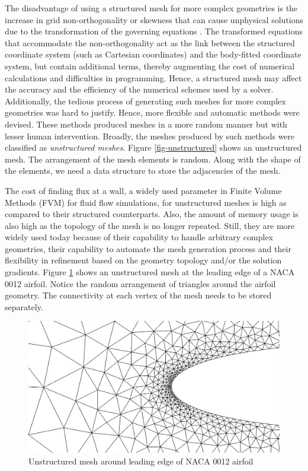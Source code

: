 The disadvantage of using a structured mesh for more complex geometries is the increase in grid non-orthogonality or skewness that can cause unphysical solutions due to the transformation of the governing equations \cite{TU2013219}. The transformed equations that accommodate the non-orthogonality act as the link between the structured coordinate system (such as Cartesian coordinates) and the body-fitted coordinate system, but contain additional terms, thereby augmenting the cost of numerical calculations and difficulties in programming. Hence, a structured mesh may affect the accuracy and the efficiency of the numerical schemes used by a solver. Additionally, the tedious process of generating such meshes for more complex geometries was hard to justify. Hence, more flexible and automatic methods were devised. These methods produced meshes in a more random manner but with lesser human intervention. Broadly, the meshes produced by such methods were classified as \textit{unstructured meshes}. Figure \ref{fig-unstructured} shows an unstructured mesh. The arrangement of the mesh elements is random. Along with the shape of the elements, we need a data structure to store the adjacencies of the mesh.

The cost of finding flux at a wall, a widely used parameter in Finite Volume Methods (FVM) for fluid flow simulations, for unstructured meshes is high as compared to their structured counterparts. Also, the amount of memory usage is also high as the topology of the mesh is no longer repeated. Still, they are more widely used today because of their capability to handle arbitrary complex geometries, their capability to automate the mesh generation process and their flexibility in refinement based on the geometry topology and/or the solution gradients. Figure \ref{fig-unstructuredNaca0012} shows an unstructured mesh at the leading edge of a NACA 0012 airfoil. Notice the random arrangement of triangles around the airfoil geometry. The connectivity at each vertex of the mesh needs to be stored separately.

\begin{figure}
  \centering
  \includegraphics[width=0.8\linewidth]{img/intro/unstructuredNaca0012.png}
  \caption{Unstructured mesh around leading edge of NACA 0012 airfoil}
  \label{fig-unstructuredNaca0012}
\end{figure}

